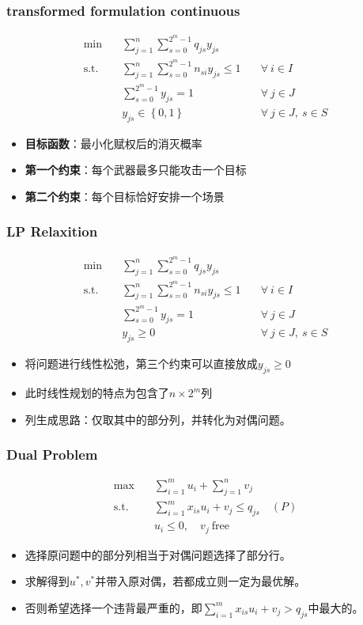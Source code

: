 \documentclass[10pt]{beamer}
\newcommand{\sumFromTo}[3]{\ensuremath{\sum_{#1}^{#2} #3}}
\newcommand{\optimalProblem}[3]
{\begin{align*}
    #1 \quad &#2 \\
    \mathrm{s. t.}\quad&#3
\end{align*}}
\begin{document}
\begin{frame}
    \frametitle{transformed formulation continuous}
    \optimalProblem{\min}{\sumFromTo{j = 1}{n}{\sumFromTo{s = 0}{2^m -1}{q_{js}y_{js}}}}{\sumFromTo{j = 1}{n}{\sumFromTo{s = 0}{2^m -1}{n_{si}y_{js}}}\leq 1 \quad &\forall ~ i \in I\\& \sumFromTo{s = 0}{2^m - 1}{y_{js}} = 1 \quad &\forall ~ j \in J\\& y_{js} \in \left\{ 0,1 \right\} & \forall ~ j\in J,\ s\in S}
    \begin{itemize}
        \item \textbf{目标函数}：最小化赋权后的消灭概率
        \item \textbf{第一个约束}：每个武器最多只能攻击一个目标
        \item \textbf{第二个约束}：每个目标恰好安排一个场景
    \end{itemize}
\end{frame}

\begin{frame}
    \frametitle{LP Relaxition}
    \optimalProblem{\min}{\sumFromTo{j = 1}{n}{\sumFromTo{s = 0}{2^m -1}{q_{js}y_{js}}}}{\sumFromTo{j = 1}{n}{\sumFromTo{s = 0}{2^m -1}{n_{si}y_{js}}}\leq 1 \quad &\forall ~ i \in I\\& \sumFromTo{s = 0}{2^m - 1}{y_{js}} = 1 \quad &\forall ~  j \in J\\& y_{js} \geq 0 &\forall ~ j\in J,\ s\in S}
    \begin{itemize}
        \item 将问题进行线性松弛，第三个约束可以直接放成$y_{js} \geq 0$
        \item 此时线性规划的特点为包含了$n \times 2^m$列
        \item 列生成思路：仅取其中的部分列，并转化为对偶问题。
    \end{itemize}
\end{frame}

\begin{frame}
    \frametitle{Dual Problem}
    \optimalProblem{\max}{\sumFromTo{i=1}{m}{u_i} + \sumFromTo{j=1}{n}{v_j}}{\sumFromTo{i=1}{m}{x_{is}u_i}+ v_j \leq q_{js}\quad (P) \\ &u_i \leq 0,\quad v_j\ \mathrm{free}}
    \begin{itemize}
        \item 选择原问题中的部分列相当于对偶问题选择了部分行。
        \item 求解得到$u^*, v^*$并带入原对偶，若都成立则一定为最优解。
        \item 否则希望选择一个违背最严重的，即$\sumFromTo{i=1}{m}{x_{is}u_i}+ v_j > q_{js}$中最大的。
    \end{itemize}
\end{frame}
\end{document}
